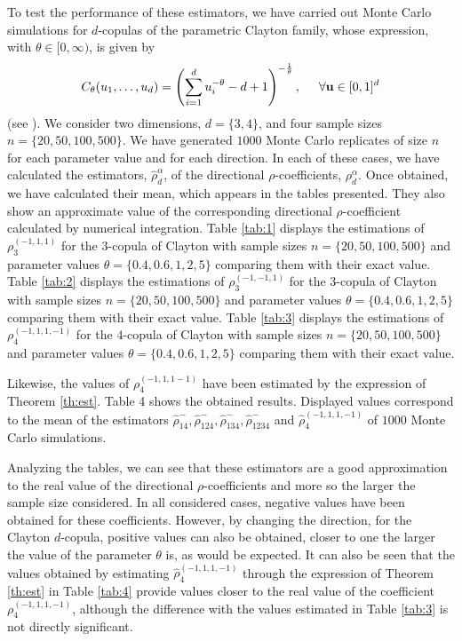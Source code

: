 \documentclass[11pt,a4paper]{article}
\def\uu{{\mathbf u}}
\begin{document}
 To test the performance of these estimators, we have carried out Monte Carlo simulations for $d$-copulas of the parametric Clayton family, whose expression, with $\theta\in [0,\infty)$, is given by
 $$C_\theta(u_1,\ldots,u_d)=\left(\sum_{i=1}^d u_i^{-\theta}-d+1\right)^{-\frac{1}{\theta}}, \hspace{0.5cm}\forall \uu\in[0,1]^d$$
(see \cite{Ne06}). We consider two dimensions, $d=\{3,4\}$, and four sample sizes $n=\{20,50,100,500\}$. We have generated $1000$ Monte Carlo replicates of size $n$ for each parameter value and for each direction. In each of these cases, we have calculated the estimators, $\widehat{\rho}_d^\alpha$, of the directional $\rho$-coefficients, $\rho_d^\alpha$. Once obtained, we have calculated their mean, which appears in the tables presented. They also show an approximate value of the corresponding directional $\rho$-coefficient calculated by numerical integration. Table \ref{tab:1} displays the estimations of $\rho_3^{(-1,1,1)}$ for the $3$-copula of Clayton with sample sizes $n=\{20,50,100,500\}$ and parameter values $\theta=\{0.4, 0.6, 1, 2, 5\}$ comparing them with their exact value. Table \ref{tab:2} displays the estimations of $\rho_3^{(-1,-1,1)}$ for the $3$-copula of Clayton with sample sizes $n=\{20,50,100,500\}$ and parameter values $\theta=\{0.4, 0.6, 1, 2, 5\}$ comparing them with their exact value. Table \ref{tab:3} displays the estimations of $\rho_4^{(-1,1,1,-1)}$ for the $4$-copula of Clayton with sample sizes $n=\{20,50,100,500\}$ and parameter values $\theta=\{0.4, 0.6, 1, 2, 5\}$ comparing them with their exact value.

Likewise, the values of $\rho_4^{(-1,1,1-1)}$ have been estimated by the expression of Theorem \ref{th:est}. Table 4 shows the obtained results. Displayed values correspond to the mean of the estimators $\widehat{\rho}_{14}^-, \widehat{\rho}_{124}^-, \widehat{\rho}_{134}^-, \widehat{\rho}_{1234}^-$ and $\widehat{\rho}_4^{(-1,1,1,-1)}$ of $1000$ Monte Carlo simulations.

Analyzing the tables, we can see that these estimators are a good approximation to the real value of the directional $\rho$-coefficients and more so the larger the sample size considered. In all considered cases, negative values have been obtained for these coefficients. However, by changing the direction, for the Clayton $d$-copula, positive values can also be obtained, closer to one the larger the value of the parameter $\theta$ is, as would be expected. It can also be seen that the values obtained by estimating $\widehat{\rho}_4^{(-1,1,1,-1)}$ through the expression of Theorem \ref{th:est} in Table \ref{tab:4} provide values closer to the real value of the coefficient $\rho_4^{(-1,1,1,-1)}$, although the difference with the values estimated in Table \ref{tab:3} is not directly significant.
\end{document}
